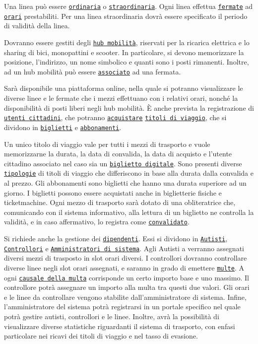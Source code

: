 \documentclass[12pt,a4paper]{report}
\begin{document}
Una linea può essere \underline{\texttt{ordinaria}} o \underline{\texttt{straordinaria}}. Ogni linea effettua \underline{\texttt{fermate}} ad \underline{\texttt{orari}} prestabiliti. Per una linea straordinaria dovrà essere specificato il periodo di validità della linea.

Dovranno essere gestiti degli \underline{\texttt{hub mobilità}}, riservati per la ricarica elettrica e lo sharing di bici, monopattini e scooter. In particolare, si devono memorizzare la posizione, l’indirizzo, un nome simbolico e quanti sono i posti rimanenti. Inoltre, ad un hub mobilità può essere \underline{\texttt{associato}} ad una fermata.

Sarà disponibile una piattaforma online, nella quale si potranno visualizzare le diverse linee e le fermate che i mezzi effettuano con i relativi orari, nonché la disponibilità di posti liberi negli hub mobilità. È anche prevista la registrazione di \underline{\texttt{utenti cittadini}}, che potranno \underline{\texttt{acquistare}} \underline{\texttt{titoli di viaggio}}, che si dividono in \underline{\texttt{biglietti}} e \underline{\texttt{abbonamenti}}.

Un unico titolo di viaggio vale per tutti i mezzi di trasporto e vuole memorizzarne la durata, la data di convalida, la data di acquisto e l’utente cittadino associato nel caso sia un \underline{\texttt{biglietto digitale}}. Sono presenti diverse \underline{\texttt{tipologie}} di titoli di viaggio che differiscono in base alla durata dalla convalida e al prezzo. Gli abbonamenti sono biglietti che hanno una durata superiore ad un giorno. I biglietti possono essere acquistati anche in biglietterie fisiche e ticketmachine. Ogni mezzo di trasporto sarà dotato di una obliteratrice che, comunicando con il sistema informativo, alla lettura di un biglietto ne controlla la validità, e in caso affermativo, lo registra come \underline{\texttt{convalidato}}.

Si richiede anche la gestione dei \underline{\texttt{dipendenti}}. Essi si dividono in \underline{\texttt{Autisti}}, \underline{\texttt{Controllori}} e \underline{\texttt{Amministratori di sistema}}. Agli Autisti a verranno assegnati diversi mezzi di trasposto in slot orari diversi. I controllori dovranno controllare diverse linee negli slot orari assegnati, e saranno in grado di emettere \underline{\texttt{multe}}.  A ogni \underline{\texttt{causale della multa}} corrisponde un certo importo base e uno massimo. Il controllore potrà assegnare un importo alla multa tra questi due valori. Gli orari e le linee da controllare vengono stabilite dall’amministratore di sistema. Infine, l’amministratore del sistema potrà registrarsi in un portale specifico nel quale potrà gestire autisti, controllori e le linee. Inoltre, avrà la possibilità di visualizzare diverse statistiche riguardanti il sistema di trasporto, con enfasi particolare nei ricavi dei titoli di viaggio e nel tasso di evasione.
\end{document}
